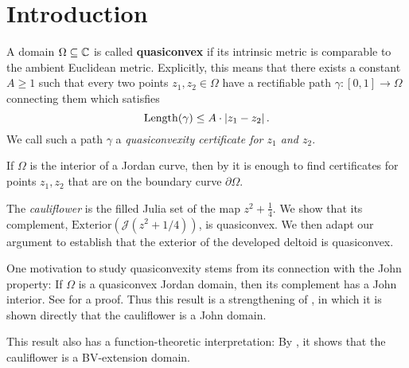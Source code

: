 


\section{Introduction}
A domain $\Omega\subseteq\mathbb{C}$ is called \textbf{quasiconvex }if its
intrinsic metric is comparable to the ambient Euclidean metric. Explicitly,
this means that there exists a constant $A\geq1$ such that every
two points $z_{1},z_{2}\in\Omega$ have a rectifiable path $\gamma:\left[0,1\right]\to\Omega$
connecting them which satisfies
\[
\operatorname{Length}(\gamma)\leq A\cdot\left|z_{1}-z_{2}\right|.
\]
We call such a path $\gamma$ a \emph{quasiconvexity certificate for
$z_{1}$ and $z_{2}$}.

If $\Omega$ is the interior of a Jordan curve, then by \cite[Corollary F]{hakobyan_euclidean_2008}
it is enough to find certificates for points $z_{1},z_{2}$ that are
on the boundary curve $\partial\Omega$.%
\begin{comment}
It is also shown in \cite{hakobyan_euclidean_2008} that any quasidisk is quasiconvex.
\end{comment}

The \emph{cauliflower} is the filled Julia set of the map $z^2+\frac 14$.
We show that its complement, $\mathrm{Exterior}(\mathcal{J}(z^{2}+1/4))$,
is quasiconvex. We then adapt our argument to establish that the exterior of the developed deltoid is quasiconvex.

One motivation to study quasiconvexity stems from its connection with the
John property: If $\Omega$ is a quasiconvex Jordan domain, then its complement has a John interior. See \cite[Corollary 3.4]{hakobyan_euclidean_2008} for a proof.
Thus this result is a strengthening of \cite[Theorem 6.1]{carleson_julia_1994}, in which it is shown directly that the cauliflower is a John domain.

This result also has a function-theoretic interpretation: By \cite[Theorem 1.1]{koskela_geometric_2010}, it shows that the cauliflower is a BV-extension domain.

\begin{comment}
The Filled Julia set of $z^{2}+1/4$, called the cauliflower, has
an inward-pointing cusp and hence is not quasiconvex.
\end{comment}

\begin{comment}
Thus, for any $c$ in 

For values $c$ in quadratic polynomials $f_{c}(z)=z^{2}+c$
\end{comment}
\begin{comment}
If $f_{c}$ has an attracting fixed point then its Julia set $\mathcal{J}(f_{c})$
is a quasicircle, hence its interior and exterior are both quasiconvex.
This is the case for values of $c$ in the main cardioid of the Mandelbrot
set.
, i.e.\ for 
\[
c\in\left\{ -\frac{\lambda}{2}-\frac{\lambda^{2}}{4}:\,\left|\lambda\right|<1\right\} .
\]
\end{comment}

